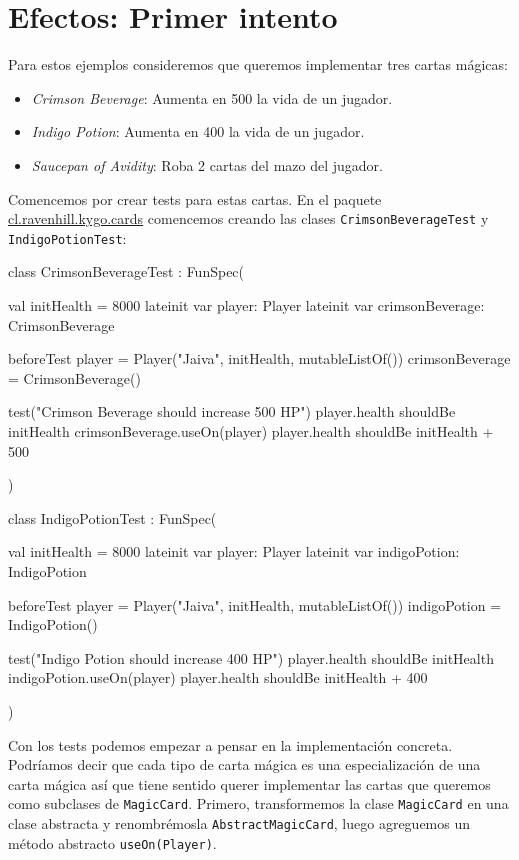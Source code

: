 \section{Efectos: Primer intento}
  \label{sec:oop:strategy:effect:1}

  Para estos ejemplos consideremos que queremos implementar tres cartas mágicas:

  \begin{itemize}
    \item \textit{Crimson Beverage}: Aumenta en 500 la vida de un jugador.
    \item \textit{Indigo Potion}: Aumenta en 400 la vida de un jugador.
    \item \textit{Saucepan of Avidity}: Roba 2 cartas del mazo del jugador.
  \end{itemize}

  Comencemos por crear tests para estas cartas.
  En el paquete \url{cl.ravenhill.kygo.cards} comencemos creando las clases 
  \texttt{CrimsonBeverageTest} y \texttt{IndigoPotionTest}:

  \begin{kotlin}
    class CrimsonBeverageTest : FunSpec({
      val initHealth = 8000
      lateinit var player: Player
      lateinit var crimsonBeverage: CrimsonBeverage

      beforeTest {
        player = Player("Jaiva", initHealth, mutableListOf())
        crimsonBeverage = CrimsonBeverage()
      }

      test("Crimson Beverage should increase 500 HP") {
        player.health shouldBe initHealth
        crimsonBeverage.useOn(player)
        player.health shouldBe initHealth + 500
      }
    })
  \end{kotlin}

  \begin{kotlin}
    class IndigoPotionTest : FunSpec({
      val initHealth = 8000
      lateinit var player: Player
      lateinit var indigoPotion: IndigoPotion

      beforeTest {
        player = Player("Jaiva", initHealth, mutableListOf())
        indigoPotion = IndigoPotion()
      }

      test("Indigo Potion should increase 400 HP") {
        player.health shouldBe initHealth
        indigoPotion.useOn(player)
        player.health shouldBe initHealth + 400
      }
    })
  \end{kotlin}

  Con los tests podemos empezar a pensar en la implementación concreta.
  Podríamos decir que cada tipo de carta mágica es una especialización de una carta mágica así que
  tiene sentido querer implementar las cartas que queremos como subclases de \texttt{MagicCard}.
  Primero, transformemos la clase \texttt{MagicCard} en una clase abstracta y renombrémosla
  \texttt{AbstractMagicCard}, luego agreguemos un método abstracto \texttt{useOn(Player)}.

